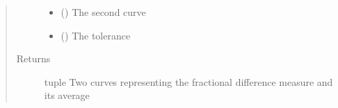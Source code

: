 \documentclass[letterpaper,10pt,english]{sphinxmanual}
\begin{document}
\begin{fulllineitems}
\begin{quote}
\begin{description}
\begin{itemize}
\item {} 
 ({\hyperref[\detokenize{pydv:curve.Curve}]{}}) \textendash{} The second curve

\item {} 
 () \textendash{} The tolerance

\end{itemize}

\item[{Returns}] \leavevmode
tuple \textendash{} Two curves representing the fractional difference measure and its average

\end{description}\end{quote}

\end{fulllineitems}

\end{document}
